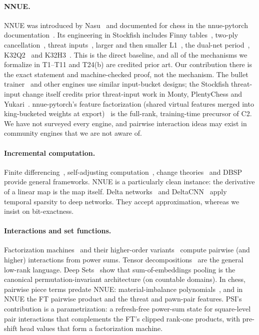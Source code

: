 \paragraph{NNUE.}
NNUE was introduced by Nasu~\cite{nasu2018} and documented for chess in the nnue-pytorch documentation~\cite{nnuepytorchdocs}.
Its engineering in Stockfish includes Finny tables~\cite{sffinny}, two-ply cancellation~\cite{sfpr5988}, threat inputs~\cite{sfthreats,sfsource}, larger and then smaller L1~\cite{pr5149}, the dual-net period~\cite{pr4915}, K32Q2~\cite{sfnnv18} and K32H3~\cite{pr563}.
This is the direct baseline, and all of the mechanisms we formalize in T1--T11 and T24(b) are credited prior art.
Our contribution there is the exact statement and machine-checked proof, not the mechanism.
The bullet trainer~\cite{bullet} and other engines use similar input-bucket designs; the Stockfish threat-input change itself credits prior threat-input work in Monty, PlentyChess and Yukari~\cite{sfthreats}.
nnue-pytorch's feature factorization (shared virtual features merged into king-bucketed weights at export)~\cite{nnuepytorchdocs} is the full-rank, training-time precursor of C2.
We have not surveyed every engine, and pairwise interaction ideas may exist in community engines that we are not aware of.

\paragraph{Incremental computation.}
Finite differencing~\cite{paige1982}, self-adjusting computation~\cite{acar2002}, change theories~\cite{cai2014} and DBSP~\cite{budiu2023} provide general frameworks.
NNUE is a particularly clean instance: the derivative of a linear map is the map itself.
Delta networks~\cite{neil2017} and DeltaCNN~\cite{parger2022} apply temporal sparsity to deep networks.
They accept approximation, whereas we insist on bit-exactness.

\paragraph{Interactions and set functions.}
Factorization machines~\cite{rendle2010} and their higher-order variants~\cite{blondel2016} compute pairwise (and higher) interactions from power sums. Tensor decompositions~\cite{kolda2009} are the general low-rank language.
Deep Sets~\cite{zaheer2017} show that sum-of-embeddings pooling is the canonical permutation-invariant architecture (on countable domains).
In chess, pairwise piece terms predate NNUE: material-imbalance polynomials~\cite{kaufman1999,sf11}, and in NNUE the FT pairwise product and the threat and pawn-pair features.
PSI's contribution is a parametrization: a refresh-free power-sum state for square-level pair interactions that complements the FT's clipped rank-one products, with pre-shift head values that form a factorization machine.

